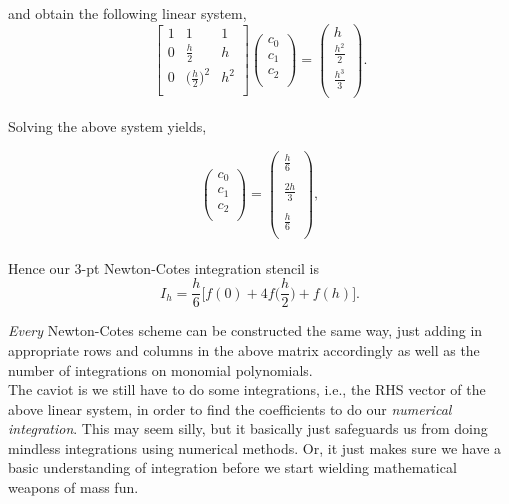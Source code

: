 \documentclass[paper=a4, fontsize=11pt]{scrartcl} %
\numberwithin{equation}{section} %
\numberwithin{figure}{section} %
\numberwithin{table}{section} %
\begin{document}
and obtain the following linear system, \\

$$\left[ \begin{array}{ccc}
1          &        	         1                     &        1       \\
0          &             \frac{h}{2}               &        h       \\
0          &  \bigg(\frac{h}{2}\bigg)^2  &        h^2   \\
\end{array} \right] %
%
\left( \begin{array}{c}
c_0 \\
c_1 \\
c_2 \\
\end{array} \right) =  
%
\left( \begin{array}{c}
h \\
\frac{h^2}{2} \\
\frac{h^3}{3} \\
\end{array} \right).$$\\

Solving the above system yields, 

$$\left( \begin{array}{c}
c_{0} \\
c_{1} \\
c_2 \\
\end{array} \right) = \left( \begin{array}{c}
\frac{h}{6} \\
\ \\
\frac{2h}{3}  \\
\ \\
\frac{h}{6}  \\
\end{array} \right),$$\\

Hence our $3$-pt Newton-Cotes integration stencil is\\

 $$I_h = \frac{h}{6} \Bigg[ f(0) + 4 f\bigg(\frac{h}{2} \bigg) + f(h) \Bigg].$$

\emph{Every} Newton-Cotes scheme can be constructed the same way, just adding in appropriate rows and columns in the above matrix accordingly as well as the number of integrations on monomial polynomials. \\

The caviot is we still have to do some integrations, i.e., the RHS vector of the above linear system, in order to find the coefficients to do our \emph{numerical integration}. This may seem silly, but it basically just safeguards us from doing mindless integrations using numerical methods. Or, it just makes sure we have a basic understanding of integration before we start wielding mathematical weapons of mass fun. \\
\end{document}
